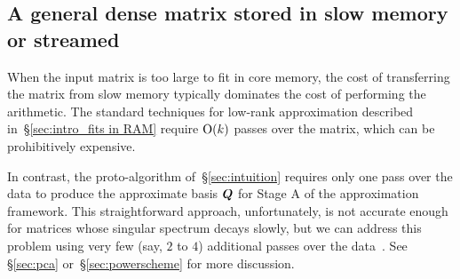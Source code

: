 \documentclass{article}
\newtheorem{remark}{Remark}
\begin{document}


\subsection{A general dense matrix stored in slow memory or streamed}

When the input matrix is too large to fit in core memory, the cost of
transferring the matrix from slow memory typically dominates the cost
of performing the arithmetic.  The standard techniques for low-rank
approximation described in~\S\ref{sec:intro_fits in RAM} require
$\mathrm{O}(k)$ passes over the matrix, which can be prohibitively expensive.

In contrast, the proto-algorithm of~\S\ref{sec:intuition}
requires only one pass over the data to produce the approximate basis
$\bm{Q}$ for Stage A of the approximation framework.
This straightforward approach, unfortunately, is not accurate enough for
matrices whose singular spectrum decays slowly, but we can address this
problem using very few (say, $2$ to $4$) additional passes over the
data~\cite{tygert_szlam}.
See \S\ref{sec:pca} or~\S\ref{sec:powerscheme} for more discussion.
\end{document}
